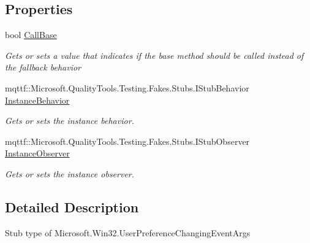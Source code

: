 \subsection*{Properties}
\begin{DoxyCompactItemize}
\item 
bool \hyperlink{class_microsoft_1_1_win32_1_1_fakes_1_1_stub_user_preference_changing_event_args_aab75721c28519c94e1449579e78da7ca}{Call\-Base}
\begin{DoxyCompactList}\small\item\em Gets or sets a value that indicates if the base method should be called instead of the fallback behavior\end{DoxyCompactList}\item 
mqttf\-::\-Microsoft.\-Quality\-Tools.\-Testing.\-Fakes.\-Stubs.\-I\-Stub\-Behavior \hyperlink{class_microsoft_1_1_win32_1_1_fakes_1_1_stub_user_preference_changing_event_args_a332a786318c08e5cc707419cd425253a}{Instance\-Behavior}
\begin{DoxyCompactList}\small\item\em Gets or sets the instance behavior.\end{DoxyCompactList}\item 
mqttf\-::\-Microsoft.\-Quality\-Tools.\-Testing.\-Fakes.\-Stubs.\-I\-Stub\-Observer \hyperlink{class_microsoft_1_1_win32_1_1_fakes_1_1_stub_user_preference_changing_event_args_a3ec6beb5af03e9c6a035e2bfd41f3c07}{Instance\-Observer}
\begin{DoxyCompactList}\small\item\em Gets or sets the instance observer.\end{DoxyCompactList}\end{DoxyCompactItemize}


\subsection{Detailed Description}
Stub type of Microsoft.\-Win32.\-User\-Preference\-Changing\-Event\-Args



